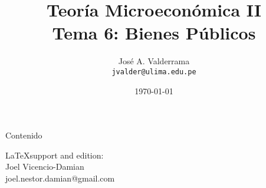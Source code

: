 \documentclass{beamer}
\title{Teoría Microeconómica II\\
		Tema 6: Bienes Públicos}
\author[José A. Valderrama]{\large{José A. Valderrama}\\
		{\small \texttt{jvalder@ulima.edu.pe} {\color{black}{\faIcon{envelope}}}}}
\institute{\large Universidad de Lima - Carrera de Economía}
\date{\today}
\begin{document}
	\begin{frame}[plain]
		\maketitle
	\end{frame}
	\begin{frame}{Contenido}
		\tableofcontents
	\end{frame}

	
	
	
	
	
	
	

	\begin{frame}
		\maketitle
		{\small
			\LaTeX \enskip support and edition:\\
			Joel Vicencio-Damian\\
			\vspace{-0.05cm}
			joel.nestor.damian@gmail.com }
	\end{frame}

\end{document}
